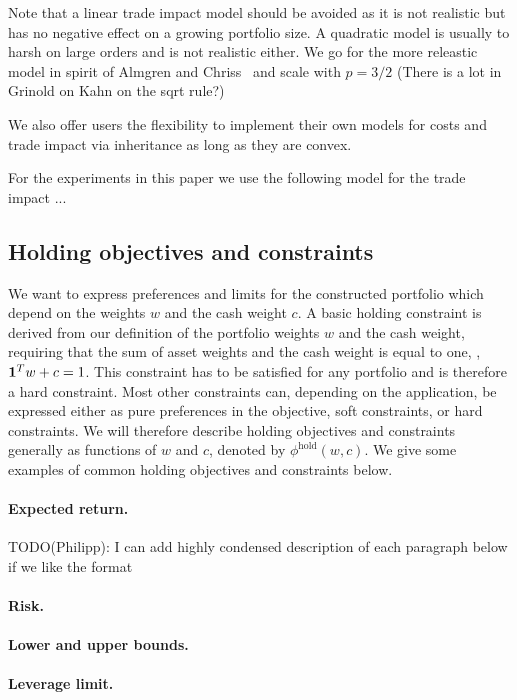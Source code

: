 \documentclass[12pt]{article}
\begin{document}
Note that a linear trade impact model should be avoided as it is not realistic
but has no negative effect on a growing portfolio size. A quadratic model is usually
to harsh on large orders and is not realistic either. We go for the more
releastic model in spirit of Almgren and Chriss~\cite{almgren2000optimal} and scale with $p=3/2$
(There is a lot in Grinold on Kahn on the sqrt rule?)

We also offer users the flexibility to implement their own models for costs and
trade impact via inheritance as long as they are convex.

For the experiments in this paper we use the following model for the trade impact
...

\subsection{Holding objectives and constraints}
We want to express preferences and limits for the constructed portfolio which
depend on the weights $w$ and the cash weight $c$. A basic holding constraint
is derived from our definition of the portfolio weights $w$ and the cash weight,
requiring that the sum of asset weights and the cash weight is equal to one,
\ie, $\mathbf 1^T w + c = 1$. This constraint has to be satisfied for any portfolio
and is therefore a hard constraint. Most other constraints can, depending on the
application, be expressed either as pure preferences in the objective,
soft constraints, or hard constraints. We will therefore describe holding
objectives and constraints generally as functions of $w$ and $c$, denoted by
$\phi^{\text{hold}}(w, c)$. We give some examples of common holding objectives
and constraints below.

\paragraph{Expected return.}
TODO(Philipp): I can add highly condensed description of each paragraph below
if we like the format

\paragraph{Risk.}

\paragraph{Lower and upper bounds.}

\paragraph{Leverage limit.}
\end{document}

